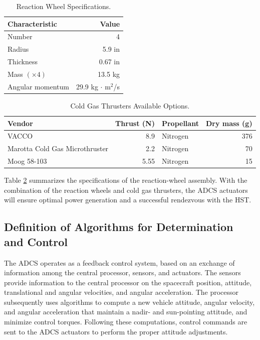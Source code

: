 \documentclass[paper=letter, fontsize=11pt]{scrartcl} %
\numberwithin{equation}{section} %
\numberwithin{figure}{section} %
\numberwithin{table}{section} %
\begin{document}
\begin{table}[H]
\centering
\begin{tabular}{l r}
\toprule
Characteristic & Value\\
\midrule
Number & 4 \\
Radius & 5.9 in \\
Thickness & 0.67 in \\
Mass $(\times 4)$ & 13.5 kg \\
Angular momentum & 29.9 \textup{kg} $\cdot$ \textup{m}$^{2}$\textup{/s}  \\
\bottomrule
\end{tabular}
\caption{Reaction Wheel Specifications.}
\label{table:actspecs}
\end{table}

\begin{table}[H]
\centering
\begin{tabular}{l r l r}
\toprule
Vendor & Thrust (N) & Propellant & Dry mass (g)\\
\midrule
VACCO                                     & 8.9     & Nitrogen      &  376 \\
Marotta Cold Gas Microthruster & 2.2    & Nitrogen  & 70    \\
Moog 58-103             & 5.55  & Nitrogen  & 15    \\
\bottomrule
\end{tabular}
\caption{Cold Gas Thrusters Available Options.}
\label{table:actspecs}
\end{table}

Table \ref{table:actspecs} summarizes the specifications of the reaction-wheel assembly. With the combination of the reaction wheels and cold gas thrusters, the ADCS actuators will ensure optimal power generation and a successful rendezvous with the HST.

\subsection{Definition of Algorithms for Determination and Control}

The ADCS operates as a feedback control system, based on an exchange of information among the central processor, sensors, and actuators. The sensors provide information to the central processor on the spacecraft position, attitude, translational and angular velocities, and angular acceleration. The processor subsequently uses algorithms to compute a new vehicle attitude, angular velocity, and angular acceleration that maintain a nadir- and sun-pointing attitude, and minimize control torques. Following these computations, control commands are sent to the ADCS actuators to perform the proper attitude adjustments.
\end{document}
